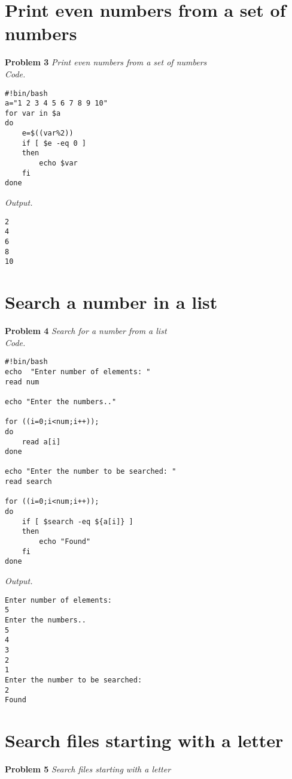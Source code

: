 \documentclass[12pt]{article}
\begin{document}
\section{Print even numbers from a set of numbers}

\textbf{Problem 3} \textit{Print even numbers from a set of numbers}\\

\textit{Code.}

\begin{lstlisting}
#!bin/bash
a="1 2 3 4 5 6 7 8 9 10"
for var in $a
do
	e=$((var%2))
	if [ $e -eq 0 ]
	then
		echo $var
	fi
done
\end{lstlisting}

\textit{Output.}
\begin{lstlisting}
2
4
6
8
10
\end{lstlisting}

\section{Search a number in a list}

\textbf{Problem 4} \textit{Search for a number from a list}\\

\textit{Code.}

\begin{lstlisting}
#!bin/bash
echo  "Enter number of elements: "
read num

echo "Enter the numbers.."

for ((i=0;i<num;i++));
do
	read a[i]
done

echo "Enter the number to be searched: "
read search

for ((i=0;i<num;i++));
do
	if [ $search -eq ${a[i]} ]
	then
		echo "Found"
	fi
done
\end{lstlisting}

\textit{Output.}
\begin{lstlisting}
Enter number of elements: 
5
Enter the numbers..
5
4
3
2
1
Enter the number to be searched: 
2
Found
\end{lstlisting}

\section{Search files starting with a letter}

\textbf{Problem 5} \textit{Search files starting with a letter}\\
\end{document}
